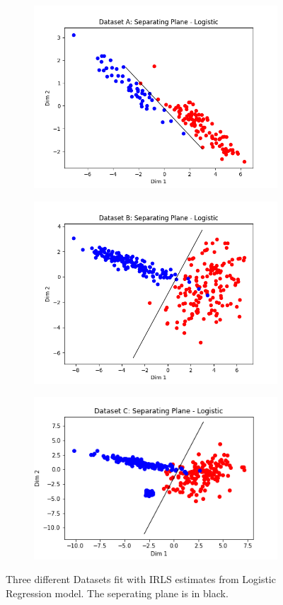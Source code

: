\documentclass[paper=a4, fontsize=11pt]{scrartcl} %
\numberwithin{equation}{section} %
\numberwithin{figure}{section} %
\numberwithin{table}{section} %
\begin{document}
	\begin{figure}
		\begin{subfigure}{.5\textwidth}
			\centering
			\includegraphics[width=.9\linewidth]{img_A_Log.png}
		\end{subfigure}
		\begin{subfigure}{.5\textwidth}
			\centering
			\includegraphics[width=.9\linewidth]{img_B_Log.png}
		\end{subfigure}
		\begin{subfigure}{.5\textwidth}
			\centering
			\includegraphics[width=.9\linewidth]{img_C_Log.png}
		\end{subfigure}
		\caption{Three different Datasets fit with IRLS estimates from Logistic Regression model. The seperating plane is in black.}
	\end{figure}
	
\end{document}
